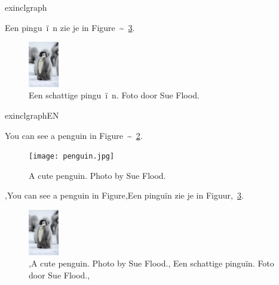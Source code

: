 

\begin{saveblock}{exinclgraph}
	\begin{highlightblock}[linewidth=0.95\textwidth,framexleftmargin=0.25em]
		Een pingu~\"i~n zie je in Figure~\textasciitilde~\ref{fig:pinguin}.
		\begin{figure}[h]
			\centering
			\includegraphics[height=2cm]{pinguin.jpg}
			\caption{Een schattige pingu~\"i~n. Foto door
			Sue Flood.}\label{fig:pinguin}
		\end{figure}
	\end{highlightblock}
\end{saveblock}

\begin{saveblock}{exinclgraphEN}
	\begin{highlightblock}[linewidth=0.95\textwidth,framexleftmargin=0.25em]
		You can see a penguin in Figure~\textasciitilde~\ref{fig:penguin}.
		\begin{figure}[h]
			\centering
			\texttt{[image: penguin.jpg]}
			\caption{A cute penguin. Photo by Sue Flood.}
			\label{fig:penguin}
		\end{figure}
	\end{highlightblock}
\end{saveblock}

\begin{frame}{%
    }%
	\vspace{-28px}
	
	\begin{penExResult}[3cm]
		\lang,You can see a penguin in Figure,Een pinguïn zie je in Figuur,~\ref{fig:pinguin}.
		\begin{figure}[h]
			\centering
			\includegraphics[height=2cm]{assets/pinguin.jpg}
			\caption{\lang,A cute penguin. Photo by Sue Flood.,%
			Een schattige pinguïn. Foto door Sue Flood.,}\label{fig:pinguin}
		\end{figure}
	\end{penExResult}
\end{frame}

